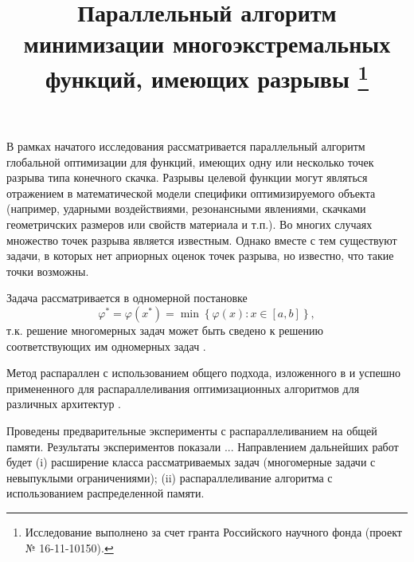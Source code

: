 \documentclass[11pt, oneside, a4paper]{article}
\begin{document}

\title{Параллельный алгоритм минимизации многоэкстремальных функций, имеющих разрывы \footnote{Исследование выполнено за счет гранта Российского научного фонда (проект № 16-11-10150).}}


В рамках начатого исследования рассматривается параллельный алгоритм глобальной оптимизации для функций, имеющих одну или несколько точек разрыва типа конечного скачка. Разрывы целевой функции могут являться отражением в математической модели специфики оптимизируемого объекта (например, ударными воздействиями, резонансными явлениями, скачками геометричских размеров или свойств материала и т.п.). Во многих случаях множество точек разрыва является известным. Однако вместе с тем существуют задачи, в которых нет априорных оценок точек разрыва, но известно, что такие точки возможны. 

Задача рассматривается в одномерной постановке
\[
\varphi^* = \varphi(x^*)=\min\left\{\varphi(x):x\in[a,b]\right\},
\] 
т.к. решение многомерных задач может быть сведено к решению соответствующих им одномерных задач \cite{Grishagin07}.

Метод распараллен с использованием общего подхода, изложенного в \cite{Strongin13} и успешно примененного для распараллеливания оптимизационных алгоритмов для различных архитектур \cite{Barkalov14,Barkalov16}.

Проведены предварительные эксперименты с распараллеливанием на общей памяти.
Результаты экспериментов показали ...
Направлением дальнейших работ будет (i) расширение класса рассматриваемых задач (многомерные задачи с невыпуклыми ограничениями); (ii) распараллеливание алгоритма с использованием распределенной памяти.
\end{document}
